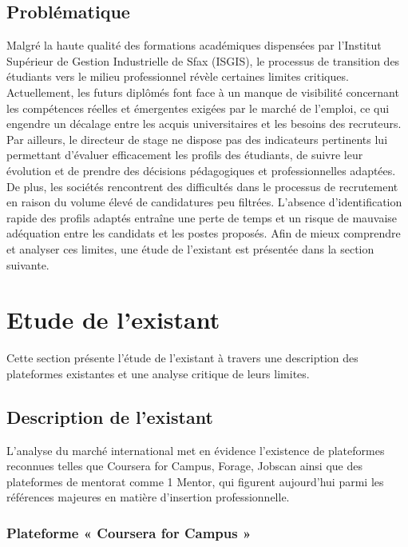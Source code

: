 \subsection{Problématique}

Malgré la haute qualité des formations académiques dispensées par l’Institut Supérieur de Gestion Industrielle de Sfax (ISGIS), le processus de transition des étudiants vers le milieu professionnel révèle certaines limites critiques.
 Actuellement, les futurs diplômés font face à un manque de visibilité concernant les compétences réelles et émergentes exigées par le marché de l'emploi, ce qui engendre un décalage entre les acquis universitaires et les besoins des recruteurs.
Par ailleurs, le directeur de stage ne dispose pas des indicateurs pertinents lui permettant d’évaluer efficacement les profils des étudiants, de suivre leur évolution et de prendre des décisions pédagogiques et professionnelles adaptées.  
De plus, les sociétés rencontrent des difficultés dans le processus de recrutement en raison du volume élevé de candidatures peu filtrées. L’absence d’identification rapide des profils adaptés entraîne une perte de temps et un risque de mauvaise adéquation entre les candidats et les postes proposés. 
Afin de mieux comprendre et analyser ces limites, une étude de l’existant est présentée dans la section suivante.



\section{Etude de l’existant}
Cette section présente l’étude de l’existant à travers une description des plateformes existantes et une analyse critique de leurs limites.

\subsection{Description de l’existant}

L’analyse du marché international met en évidence l’existence de plateformes reconnues telles que Coursera for Campus, Forage, Jobscan ainsi que des plateformes de mentorat comme 1 Mentor, qui figurent aujourd’hui parmi les références majeures en matière d’insertion professionnelle.

\subsubsection{Plateforme « Coursera for Campus »}

